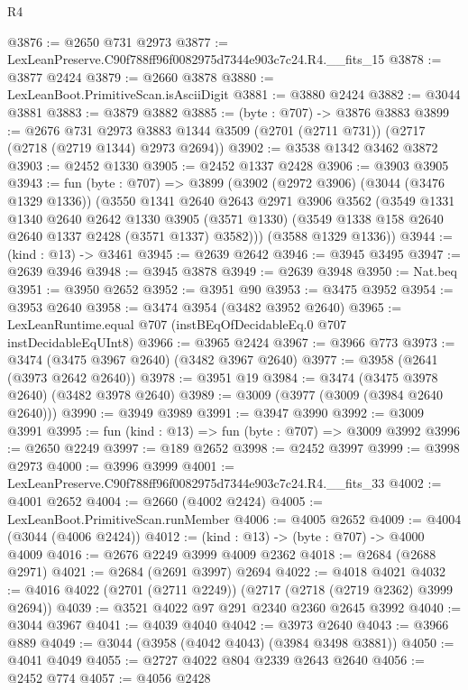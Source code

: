 \begin{lexlean}{R4}
\begin{coremodule}
@3876 := @2650 @731 @2973
@3877 := LexLeanPreserve.C90f788ff96f0082975d7344e903c7c24.R4.__fits_15
@3878 := @3877 @2424
@3879 := @2660 @3878
@3880 := LexLeanBoot.PrimitiveScan.isAsciiDigit
@3881 := @3880 @2424
@3882 := @3044 @3881
@3883 := @3879 @3882
@3885 := (byte : @707) -> @3876 @3883
@3899 := @2676
    @731
    @2973
    @3883
    @1344
    @3509
    (@2701 (@2711 @731))
    (@2717 (@2718 (@2719 @1344) @2973 @2694))
@3902 := @3538 @1342 @3462 @3872
@3903 := @2452 @1330
@3905 := @2452 @1337 @2428
@3906 := @3903 @3905
@3943 := fun (byte : @707) =>
  @3899
    (@3902
      (@2972 @3906)
      (@3044 (@3476 @1329 @1336))
      (@3550
        @1341
        @2640
        @2643
        @2971
        @3906
        @3562
        (@3549
          @1331
          @1340
          @2640
          @2642
          @1330
          @3905
          (@3571 @1330)
          (@3549 @1338 @158 @2640 @2640 @1337 @2428 (@3571 @1337) @3582)))
      (@3588 @1329 @1336))
@3944 := (kind : @13) -> @3461
@3945 := @2639 @2642
@3946 := @3945 @3495
@3947 := @2639 @3946
@3948 := @3945 @3878
@3949 := @2639 @3948
@3950 := Nat.beq
@3951 := @3950 @2652
@3952 := @3951 @90
@3953 := @3475 @3952
@3954 := @3953 @2640
@3958 := @3474 @3954 (@3482 @3952 @2640)
@3965 := LexLeanRuntime.equal @707 (instBEqOfDecidableEq.{0} @707 instDecidableEqUInt8)
@3966 := @3965 @2424
@3967 := @3966 @773
@3973 := @3474 (@3475 @3967 @2640) (@3482 @3967 @2640)
@3977 := @3958 (@2641 (@3973 @2642 @2640))
@3978 := @3951 @19
@3984 := @3474 (@3475 @3978 @2640) (@3482 @3978 @2640)
@3989 := @3009 (@3977 (@3009 (@3984 @2640 @2640)))
@3990 := @3949 @3989
@3991 := @3947 @3990
@3992 := @3009 @3991
@3995 := fun (kind : @13) => fun (byte : @707) => @3009 @3992
@3996 := @2650 @2249
@3997 := @189 @2652
@3998 := @2452 @3997
@3999 := @3998 @2973
@4000 := @3996 @3999
@4001 := LexLeanPreserve.C90f788ff96f0082975d7344e903c7c24.R4.__fits_33
@4002 := @4001 @2652
@4004 := @2660 (@4002 @2424)
@4005 := LexLeanBoot.PrimitiveScan.runMember
@4006 := @4005 @2652
@4009 := @4004 (@3044 (@4006 @2424))
@4012 := (kind : @13) -> (byte : @707) -> @4000 @4009
@4016 := @2676 @2249 @3999 @4009 @2362
@4018 := @2684 (@2688 @2971)
@4021 := @2684 (@2691 @3997) @2694
@4022 := @4018 @4021
@4032 := @4016 @4022 (@2701 (@2711 @2249)) (@2717 (@2718 (@2719 @2362) @3999 @2694))
@4039 := @3521 @4022 @97 @291 @2340 @2360 @2645 @3992
@4040 := @3044 @3967
@4041 := @4039 @4040
@4042 := @3973 @2640
@4043 := @3966 @889
@4049 := @3044 (@3958 (@4042 @4043) (@3984 @3498 @3881))
@4050 := @4041 @4049
@4055 := @2727 @4022 @804 @2339 @2643 @2640
@4056 := @2452 @774
@4057 := @4056 @2428

\end{coremodule}
\end{lexlean}
